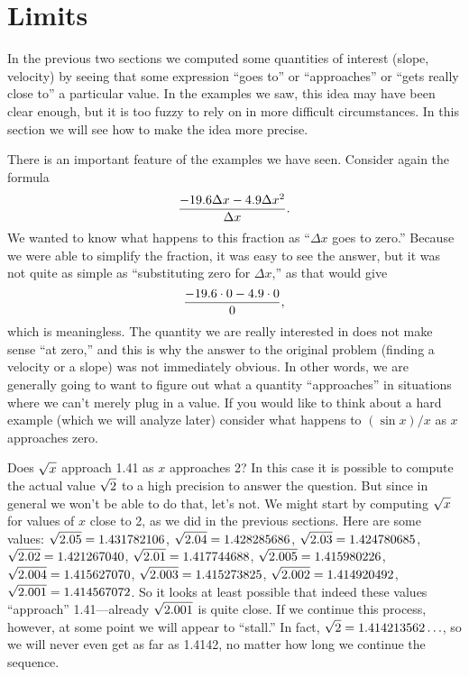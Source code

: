 \section{Limits}{}{}
\label{sec:limits}

In the previous two sections we computed some quantities of interest
(slope, velocity) by seeing that some expression ``goes to'' or
``approaches'' or ``gets really close to'' a particular value. In the
examples we saw, this idea may have been clear enough, but it is too
fuzzy to rely on in more difficult circumstances. In this section we
will see how to make the idea more precise.

There is an important feature of the examples we have seen. Consider
again the formula
$${-19.6\Delta x-4.9\Delta x^2\over \Delta x}.
$$
We wanted to know what happens to this fraction as ``$\Delta x$ goes
to zero.'' Because we were able to simplify the fraction, it was easy
to see the answer, but it was not quite as simple as ``substituting
zero for $\Delta x$,'' as that would give
$${-19.6\cdot 0 - 4.9\cdot 0\over 0},$$
which is meaningless. The quantity we are really interested in does
not make sense ``at zero,'' and this is why the answer to the original
problem (finding a velocity or a slope) was not immediately obvious. In
other words, we are generally going to want to figure out what a
quantity ``approaches'' in situations where we can't merely plug in a
value. If you would like to think about a hard example (which we will
analyze later) consider what happens to $(\sin x)/x$ as $x$ approaches
zero. 

\begin{example}
Does $\displaystyle \sqrt{x}$ approach 1.41 as $x$ approaches 2? In this case it
is possible to compute the actual value $\displaystyle \sqrt{2}$ to a high precision
to answer the question. But since in general we won't be able to do
that, let's not. We might start by computing $\displaystyle \sqrt{x}$ for values of
$x$ close to 2, as we did in the previous sections. Here are some
values: $\displaystyle \sqrt{2.05} = 1.431782106$,
        $\displaystyle \sqrt{2.04} = 1.428285686$,
        $\displaystyle \sqrt{2.03} = 1.424780685$,
        $\displaystyle \sqrt{2.02} = 1.421267040$,
        $\displaystyle \sqrt{2.01} = 1.417744688$,
        $\displaystyle \sqrt{2.005} = 1.415980226$,
        $\displaystyle \sqrt{2.004} = 1.415627070$,
        $\displaystyle \sqrt{2.003} = 1.415273825$,
        $\displaystyle \sqrt{2.002} = 1.414920492$,
        $\displaystyle \sqrt{2.001} = 1.414567072$.
So it looks at least possible that indeed these values ``approach''
1.41---already $\displaystyle \sqrt{2.001}$ is quite close. If we continue this
process, however, at some point we will appear to ``stall.'' In fact, 
$\displaystyle \sqrt{2}=1.414213562\ldots$, so we will never even get as far as
1.4142, no matter how long we continue the sequence. 
\end{example}

